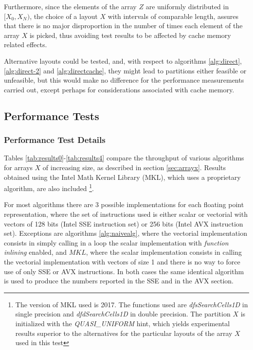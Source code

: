\documentclass[preprint,1p,times]{elsarticle}
\begin{document}
Furthermore, since the elements of the array $Z$ are uniformly distributed in $[X_0,X_{N})$, the choice of a layout $X$ with intervals of comparable length, assures that there is no major disproportion in the number of times each element of the array $X$ is picked, thus avoiding test results to be affected by cache memory related effects.

Alternative layouts could be tested, and, with respect to algorithms \ref{alg:direct}, \ref{alg:direct-2} and \ref{alg:directcache}, they might lead to partitions either feasible or unfeasible, but this would make no difference for the performance measurements carried out, except perhaps for considerations associated with cache memory.

\subsection{Performance Tests}
\label{sec:testperf}
\subsubsection{Performance Test Details}
Tables \ref{tab:results0}-\ref{tab:results4} compare the throughput of various algorithms for arrays $X$ of increasing size, as described in section \ref{sec:arrayx}. Results obtained using the Intel Math Kernel Library (MKL), which uses a proprietary algorithm, are also included \footnote{The version of MKL used is 2017. The functions used are \textit{dfsSearchCells1D} in single precision and \textit{dfdSearchCells1D} in double precision. The partition $X$ is initialized with the \textit{QUASI\_UNIFORM} hint, which yields experimental results superior to the alternatives for the particular layouts of the array $X$ used in this test}.

For most algorithms there are 3 possible implementations for each floating point representation, where the set of instructions used is either scalar or
vectorial with vectors of 128 bits (Intel SSE instruction set) or 256 bits (Intel AVX instruction set). Exceptions are algorithms \ref{alg:naivealg}, where the vectorial implementation consists in simply calling in a loop the scalar implementation with \textit{function inlining} enabled, and $MKL$, where the scalar implementation consists in calling the vectorial implementation with vectors of size 1 and there is no way to force use of only SSE or AVX instructions. In both cases the same identical algorithm is used to produce the numbers reported in the SSE and in the AVX section.
\end{document}
